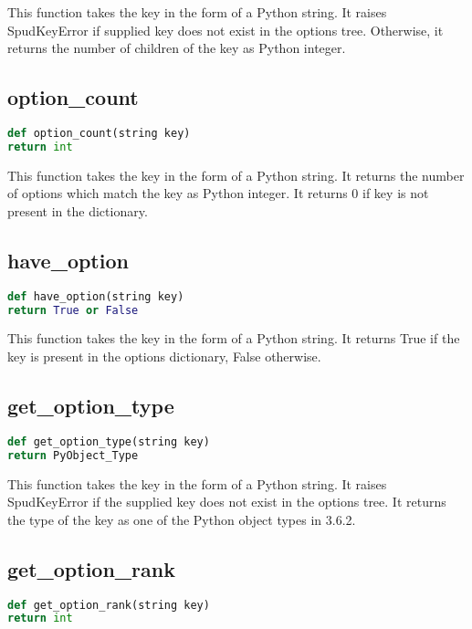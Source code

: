 \documentclass[a4paper, 11pt]{book}
\begin{document}
This function takes the key in the form of a Python string. 
It raises SpudKeyError if supplied key does not exist in the options tree.
Otherwise, it returns the number of children of the key as Python integer.

\subsection{option\_count}

\begin{lstlisting}[language=Python]
def option_count(string key)
return int
\end{lstlisting}

This function takes the key in the form of a Python string. 
It returns the number of options which match the key as Python integer.
It returns 0 if key is not present in the dictionary.

\subsection{have\_option}

\begin{lstlisting}[language=Python]
def have_option(string key)
return True or False
\end{lstlisting}

This function takes the key in the form of a Python string. 
It returns True if the key is present in the options dictionary, False otherwise.

\subsection{get\_option\_type}

\begin{lstlisting}[language=Python]
def get_option_type(string key)
return PyObject_Type
\end{lstlisting}

This function takes the key in the form of a Python string. 
It raises SpudKeyError if the supplied key does not exist in the options tree.
It returns the type of the key as one of the Python object types in 3.6.2.

\subsection{get\_option\_rank}

\begin{lstlisting}[language=Python]
def get_option_rank(string key)
return int
\end{lstlisting}
\end{document}

